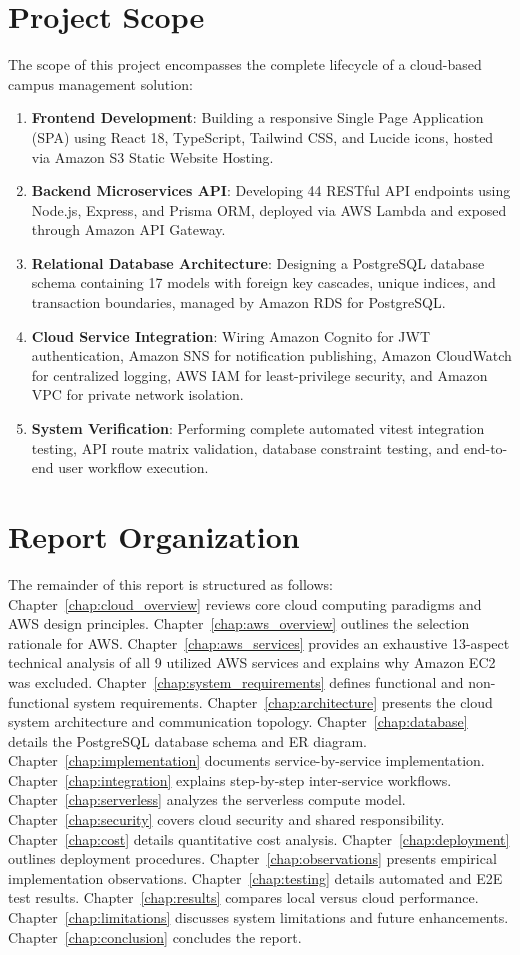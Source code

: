 \section{Project Scope}
The scope of this project encompasses the complete lifecycle of a cloud-based campus management solution:
\begin{enumerate}
    \item \textbf{Frontend Development}: Building a responsive Single Page Application (SPA) using React 18, TypeScript, Tailwind CSS, and Lucide icons, hosted via Amazon S3 Static Website Hosting.
    \item \textbf{Backend Microservices API}: Developing 44 RESTful API endpoints using Node.js, Express, and Prisma ORM, deployed via AWS Lambda and exposed through Amazon API Gateway.
    \item \textbf{Relational Database Architecture}: Designing a PostgreSQL database schema containing 17 models with foreign key cascades, unique indices, and transaction boundaries, managed by Amazon RDS for PostgreSQL.
    \item \textbf{Cloud Service Integration}: Wiring Amazon Cognito for JWT authentication, Amazon SNS for notification publishing, Amazon CloudWatch for centralized logging, AWS IAM for least-privilege security, and Amazon VPC for private network isolation.
    \item \textbf{System Verification}: Performing complete automated vitest integration testing, API route matrix validation, database constraint testing, and end-to-end user workflow execution.
\end{enumerate}

\section{Report Organization}
The remainder of this report is structured as follows:
Chapter~\ref{chap:cloud_overview} reviews core cloud computing paradigms and AWS design principles. 
Chapter~\ref{chap:aws_overview} outlines the selection rationale for AWS. 
Chapter~\ref{chap:aws_services} provides an exhaustive 13-aspect technical analysis of all 9 utilized AWS services and explains why Amazon EC2 was excluded. 
Chapter~\ref{chap:system_requirements} defines functional and non-functional system requirements. 
Chapter~\ref{chap:architecture} presents the cloud system architecture and communication topology. 
Chapter~\ref{chap:database} details the PostgreSQL database schema and ER diagram. 
Chapter~\ref{chap:implementation} documents service-by-service implementation. 
Chapter~\ref{chap:integration} explains step-by-step inter-service workflows. 
Chapter~\ref{chap:serverless} analyzes the serverless compute model. 
Chapter~\ref{chap:security} covers cloud security and shared responsibility. 
Chapter~\ref{chap:cost} details quantitative cost analysis. 
Chapter~\ref{chap:deployment} outlines deployment procedures. 
Chapter~\ref{chap:observations} presents empirical implementation observations. 
Chapter~\ref{chap:testing} details automated and E2E test results. 
Chapter~\ref{chap:results} compares local versus cloud performance. 
Chapter~\ref{chap:limitations} discusses system limitations and future enhancements. 
Chapter~\ref{chap:conclusion} concludes the report.
